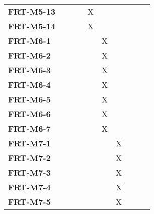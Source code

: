 \documentclass[12pt, titlepage]{article}
\begin{document}
\begin{longtable}{|l|ccccccc|}
	\textbf{FRT-M5-13} & ~                                        & ~           & X           & ~           & ~           & ~           & ~           \\
	\textbf{FRT-M5-14} & ~                                        & ~           & X           & ~           & ~           & ~           & ~           \\
	\textbf{FRT-M6-1}  & ~                                        & ~           & ~           & X           & ~           & ~           & ~           \\
	\textbf{FRT-M6-2}  & ~                                        & ~           & ~           & X           & ~           & ~           & ~           \\
	\textbf{FRT-M6-3}  & ~                                        & ~           & ~           & X           & ~           & ~           & ~           \\
	\textbf{FRT-M6-4}  & ~                                        & ~           & ~           & X           & ~           & ~           & ~           \\
	\textbf{FRT-M6-5}  & ~                                        & ~           & ~           & X           & ~           & ~           & ~           \\
	\textbf{FRT-M6-6}  & ~                                        & ~           & ~           & X           & ~           & ~           & ~           \\
	\textbf{FRT-M6-7}  & ~                                        & ~           & ~           & X           & ~           & ~           & ~           \\
	\textbf{FRT-M7-1}  & ~                                        & ~           & ~           & ~           & X           & ~           & ~           \\
	\textbf{FRT-M7-2}  & ~                                        & ~           & ~           & ~           & X           & ~           & ~           \\
	\textbf{FRT-M7-3}  & ~                                        & ~           & ~           & ~           & X           & ~           & ~           \\
	\textbf{FRT-M7-4}  & ~                                        & ~           & ~           & ~           & X           & ~           & ~           \\
	\textbf{FRT-M7-5}  & ~                                        & ~           & ~           & ~           & X           & ~           & ~           \\

\end{longtable}
\end{document}

